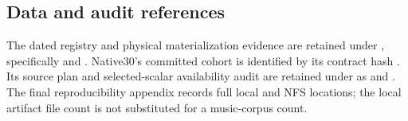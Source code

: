 \subsection{Data and audit references}

\begingroup\raggedright
The dated registry and physical materialization evidence are retained under
, specifically
 and
.
Native30's committed cohort is identified by its contract hash
.
Its source plan and selected-scalar availability audit are retained under
 as
 and
.
The final reproducibility appendix records full local and NFS locations;
the local artifact file count is not substituted for a music-corpus count.
\par\endgroup
